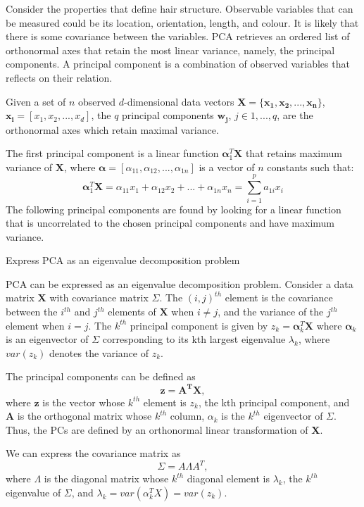 \documentclass[ %
                    author={Dillon Keith Diep [INCOMPLETE DRAFT, NOT FOR SUBMISSION]},
                supervisor={Dr. Carl Henrik Ek},
                    degree={MEng},
                     title={ARt-CG:},
                  subtitle={Assisted Real-time Content Generation of 3D Hair by Learning Manifolds},
                      type={Research},
                      year={2014} ]{dissertation}
\begin{document}
Consider the properties that define hair structure. Observable variables that can be measured could be its location, orientation, length, and colour. It is likely that there is some covariance between the variables. PCA retrieves an ordered list of orthonormal axes that retain the most linear variance, namely, the principal components. A principal component is a combination of observed variables that reflects on their relation.

Given a set of $n$ observed $d$-dimensional data vectors $\mathbf{X=\{x_1,x_2,...,x_n\}}$, $\mathbf{x_i} = [x_1,x_2,...,x_d]$, the $q$ principal components $\mathbf{w_j}$, $j \in {1,...,q}$, are the orthonormal axes which retain maximal variance.

The first principal component is a linear function $\boldsymbol{\alpha}^T_1\mathbf{X}$ that retains maximum variance of $\mathbf{X}$, where $\boldsymbol{\alpha} = [\alpha_{11}, \alpha_{12}, ..., \alpha_{1n}]$ is a vector of $n$ constants such that:
$$\boldsymbol{\alpha}^T_1\mathbf{X}=\alpha_{11}x_1+\alpha_{12}x_2+...+\alpha_{1n}x_n = \sum^p_{i=1}a_{1i}x_i$$
The following principal components are found by looking for a linear function that is uncorrelated to the chosen principal components and have maximum variance. \cite{pca2002}

{\color{red} Express PCA as an eigenvalue decomposition problem}

PCA can be expressed as an eigenvalue decomposition problem. Consider a data matrix $\mathbf{X}$ with covariance matrix $\Sigma$. The $(i,j)^{th}$ element is the covariance between the $i^{th}$ and $j^{th}$ elements of $\mathbf{X}$ when $i \neq j$, and the variance of the $j^{th}$ element when $i = j$. The $k^{th}$ principal component is given by $z_k=\boldsymbol{\alpha}^T_k\mathbf{X}$ where $\boldsymbol{\alpha}_k$ is an eigenvector of $\Sigma$ corresponding to its kth largest eigenvalue $\lambda_k$, where $var(z_k)$ denotes the variance of $z_k$.

The principal components can be defined as
$$\boldsymbol{z=A^TX},$$
where $\mathbf{z}$ is the vector whose $k^{th}$ element is $z_k$, the kth principal component, and $\mathbf{A}$ is the orthogonal matrix whose $k^{th}$ column, $\alpha_k$ is the $k^{th}$ eigenvector of $\Sigma$. Thus, the PCs are defined by an orthonormal linear transformation of $\mathbf{X}$.

We can express the covariance matrix as
$$\Sigma=A\Lambda A^T,$$
where $\Lambda$ is the diagonal matrix whose $k^{th}$ diagonal element is $\lambda_k$, the $k^{th}$ eigenvalue of $\Sigma$, and $\lambda_k = var(\alpha^T_kX)=var(z_k)$.
\end{document}

